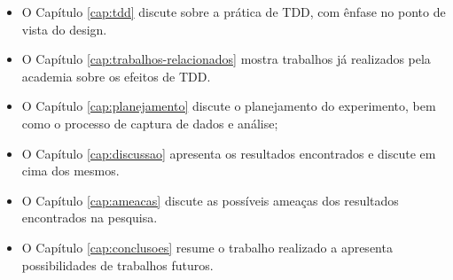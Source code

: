 \begin{itemize}
	\item O Capítulo \ref{cap:tdd} discute sobre a prática de TDD, com ênfase no
	ponto de vista do design.
  
	\item O Capítulo \ref{cap:trabalhos-relacionados} mostra trabalhos já
	realizados pela academia sobre os efeitos de TDD.

	\item O Capítulo \ref{cap:planejamento} discute o planejamento do experimento,
	bem como o processo de captura de dados e análise;

	\item O Capítulo \ref{cap:discussao} apresenta os resultados encontrados e
	discute em cima dos mesmos.
	
	\item O Capítulo \ref{cap:ameacas} discute as possíveis ameaças dos resultados
	encontrados na pesquisa.
	
	\item O Capítulo \ref{cap:conclusoes} resume o trabalho realizado a apresenta
	possibilidades de trabalhos futuros.
\end{itemize}
